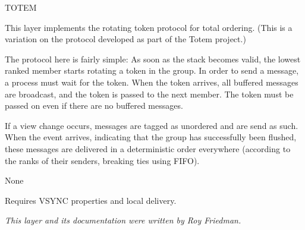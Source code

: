 %
%
%
\begin{Layer}{TOTEM}

This layer implements the rotating token protocol for total ordering.  (This is
a variation on the protocol developed as part of the Totem project.)

\begin{Protocol}
The protocol here is fairly simple: As soon as the stack becomes valid, the
lowest ranked member starts rotating a token in the group. In order to send a
message, a process must wait for the token. When the token arrives, all
buffered messages are broadcast, and the token is passed to the next member.
The token must be passed on even if there are no buffered messages.

If a view change occurs, messages are tagged as unordered and are send as
such.
When the  event arrives, indicating that the group has successfully
been flushed, these messages are delivered in a deterministic order everywhere
(according to the ranks of their senders, breaking ties using FIFO).
\end{Protocol}

\begin{Parameters}
\item None
\end{Parameters}

\begin{Properties}
\item
Requires VSYNC properties and local delivery.
\end{Properties}

\begin{Sources}
\end{Sources}

\begin{GenEvent}
\end{GenEvent}

\begin{Testing}
\item
\todo{}
\end{Testing}

\emph{This layer and its documentation were written by Roy Friedman.}
\end{Layer}
